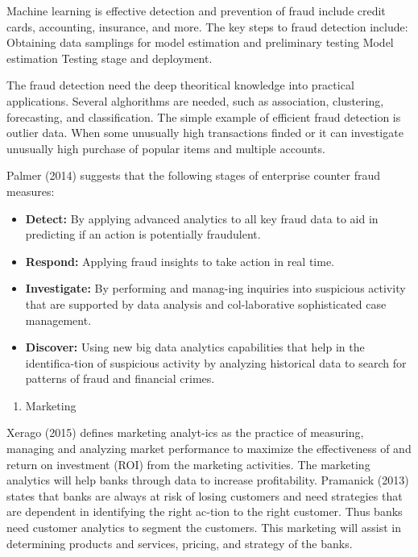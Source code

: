 \documentclass[]{book}
\providecommand{\tightlist}{%
  \setlength{\itemsep}{0pt}\setlength{\parskip}{0pt}}
\begin{document}
Machine learning is effective detection and prevention of fraud include
credit cards, accounting, insurance, and more. The key steps to fraud
detection include: Obtaining data samplings for model estimation and
preliminary testing Model estimation Testing stage and deployment.

The fraud detection need the deep theoritical knowledge into practical
applications. Several alghorithms are needed, such as association,
clustering, forecasting, and classification. The simple example of
efficient fraud detection is outlier data. When some unusually high
transactions finded or it can investigate unusually high purchase of
popular items and multiple accounts.

Palmer (2014) suggests that the following stages of enterprise counter
fraud measures:

\begin{itemize}
\tightlist
\item
  \textbf{Detect:} By applying advanced analytics to all key fraud data
  to aid in predicting if an action is potentially fraudulent. 
\item
  \textbf{Respond:} Applying fraud insights to take action in real time.
  
\item
  \textbf{Investigate:} By performing and manag-ing inquiries into
  suspicious activity that are supported by data analysis and
  col-laborative sophisticated case management. 
\item
  \textbf{Discover:} Using new big data analytics capabilities that help
  in the identifica-tion of suspicious activity by analyzing historical
  data to search for patterns of fraud and financial crimes.
\end{itemize}

\begin{enumerate}
\def\labelenumi{\arabic{enumi}.}
\setcounter{enumi}{1}
\tightlist
\item
  Marketing
\end{enumerate}

Xerago (2015) defines marketing analyt-ics as the practice of measuring,
managing and analyzing market performance to maximize the effectiveness
of and return on investment (ROI) from the marketing activities. The
marketing analytics will help banks through data to increase
profitability. Pramanick (2013) states that banks are always at risk of
losing customers and need strategies that are dependent in identifying
the right ac-tion to the right customer. Thus banks need customer
analytics to segment the customers. This marketing will assist in
determining products and services, pricing, and strategy of the banks.
\end{document}
